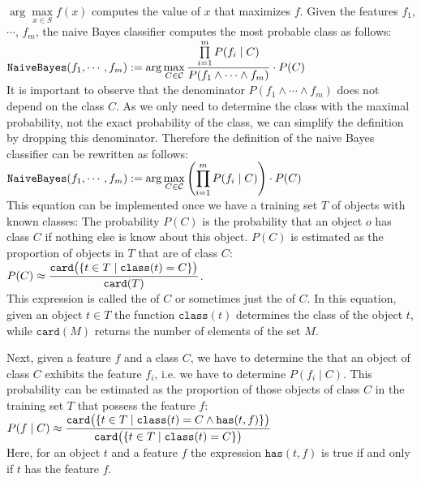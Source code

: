 $\arg\max\limits_{x \in S} f(x)$ computes the value of $x$ that maximizes $f$.  Given the features  $f_1$, $\cdots$,
$f_m$, the naive Bayes classifier computes the most probable class as follows:
\\[0.2cm]
\hspace*{1.3cm}
$\displaystyle \texttt{NaiveBayes}(f_1,\cdots,f_m) :=
  \arg\max\limits_{C \in \mathcal{C}}  \frac{\prod\limits_{i=1}^m P(f_i \;|\; C)}{P(f_1 \wedge \cdots \wedge f_m)} \cdot P(C) 
$
\\[0.2cm]
It is important to observe that the denominator $P(f_1 \wedge \cdots \wedge f_m)$ does not depend on the class
$C$.  As we only need to determine the class with the maximal probability, not the exact probability of the
class, we can simplify the definition by dropping this denominator.  Therefore the definition of the naive
Bayes classifier can be rewritten as follows:
\\[0.2cm]
\hspace*{1.3cm}
$\displaystyle \texttt{NaiveBayes}(f_1,\cdots,f_m) :=
  \arg\max\limits_{C \in \mathcal{C}}  \left(\prod\limits_{i=1}^m P(f_i \;|\; C)\right) \cdot P(C) 
$
\\[0.2cm]
This equation can be implemented once we have a training set $T$ of objects with known classes:  
The probability $P(C)$ is the probability that an object $o$ has class $C$
if nothing else is know about this object.  $P(C)$ is estimated as the proportion of objects in $T$ that are
of class $C$:
\\[0.2cm]
\hspace*{1.3cm}
$ \displaystyle P(C) \approx \frac{\texttt{card}\bigl(\{t \in T \;|\; \texttt{class}(t) = C \}\bigr)}{\texttt{card}(T)}$.
\\[0.2cm]
This expression is called the  of $C$ or sometimes just the  of $C$.
In this equation, given an object $t\in T$ the function $\texttt{class}(t)$ determines the class of the object
$t$, while $\texttt{card}(M)$ returns the number of elements of the set $M$.

Next, given a feature $f$ and a class $C$, we have to determine the  that an
object of class $C$ exhibits the feature $f_i$, i.e. we have to determine $P(f_i \;|\; C)$.
This probability can be estimated as the proportion of those objects of class $C$ in the training set $T$ that
possess the feature $f$:
\\[0.2cm]
\hspace*{1.3cm}
$\displaystyle P(f\;|\;C) \approx 
 \frac{\texttt{card}\bigl(\{t \in T \;|\; \texttt{class}(t) = C \wedge \texttt{has}(t, f) \}\bigr)}{
       \texttt{card}\bigl(\{t \in T \;|\; \texttt{class}(t) = C \}\bigr)} 
$
\\[0.2cm]
Here, for an object $t$ and a feature $f$ the expression $\texttt{has}(t, f)$ is true if and only if $t$ has
the feature $f$.


